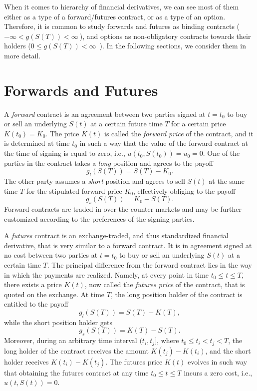 \documentclass{UUThesisTemplate}
\begin{document}
\par
When it comes to hierarchy of financial derivatives, we can see most of them either as a type of a forward/futures contract, or as a type of an option. Therefore, it is common to study forwards and futures as binding contracts ($-\infty < g(S(T)) < \infty\ $), and options as non-obligatory contracts towards their holders ($0\leq g(S(T))<\infty$\ ). In the following sections, we consider them in more detail.
%





%
\section{Forwards and Futures}
\label{sec:futures}

\par
A \emph{forward} contract is an agreement between two parties signed at $t=t_0$ to buy or sell an underlying $S(t)$ at a certain future time $T$ for a certain price $K(t_0)=K_0$. The price $K(t)$ is called the \emph{forward price} of the contract, and it is determined at time $t_0$ in such a way that the value of the forward contract at the time of signing is equal to zero, i.e., $u(t_0,S(t_0))=u_0=0$. One of the parties in the contract takes a \emph{long} position and agrees to the payoff 
$$g_l(S(T))=S(T)-K_0.$$
The other party assumes a \emph{short} position and agrees to sell $S(t)$ at the same time $T$ for the stipulated forward price $K_0$, effectively obliging to the payoff 
$$g_s(S(T))=K_0-S(T).$$
Forward contracts are traded in over-the-counter markets and may be further customized according to the preferences of the signing parties.

\par
A \emph{futures} contract is an exchange-traded, and thus standardized financial derivative, that is very similar to a forward contract. It is in agreement signed at no cost between two parties at $t=t_0$ to buy or sell an underlying $S(t)$ at a certain time $T$. The principal difference from the forward contract lies in the way in which the payments are realized. Namely, at every point in time $t_0 \leq t \leq T$, there exists a price $K(t)$, now called the \emph{futures price} of the contract, that is quoted on the exchange. At time $T$, the long position holder of the contract is entitled to the payoff 
$$g_l(S(T))=S(T)-K(T),$$
while the short position holder gets 
$$g_s(S(T))=K(T)-S(T).$$
Moreover, during an arbitrary time interval $(t_i,t_j]$, where $t_0 \leq t_i < t_j < T$, the long holder of the contract receives the amount $K(t_j)-K(t_i)$, and the short holder receives $K(t_i)-K(t_j)$. The futures price $K(t)$ evolves in such way that obtaining the futures contract at any time $t_0 \leq t \leq T$ incurs a zero cost, i.e., $u(t,S(t))=0$. 
\end{document}
